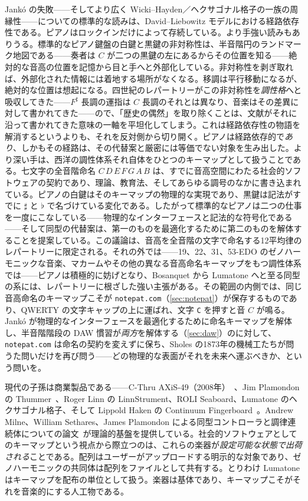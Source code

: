 \documentclass[10pt,letterpaper,twocolumn]{article}
\begin{document}
Jankó の失敗——そしてより広く Wicki--Hayden／ヘクサゴナル格子の一族の周縁性——についての標準的な読みは、David--Liebowitz モデルにおける経路依存性である。ピアノはロックインだけによって存続している。より手強い読みもありうる。標準的なピアノ鍵盤の白鍵と黒鍵の非対称性は、半音階円のランドマーク地図である——奏者は $C$ が二つの黒鍵の左にあるからその位置を知る——絶対的な音高の位置を記憶から目と手へと外部化している。非対称性を剥ぎ取れば、外部化された情報には着地する場所がなくなる。移調は平行移動になるが、絶対的な位置は想起になる。四世紀のレパートリーがこの非対称性を\emph{調性格}へと吸収してきた——$F^\sharp$ 長調の運指は $C$ 長調のそれとは異なり、音楽はその差異に対して書かれてきた——ので、「歴史の偶然」を取り除くことは、文献がそれに沿って書かれてきた意味の一軸を平坦化してしまう。これは経路依存性の物語を解消するというよりも、それを反対側から切り開く。ピアノは経路依存的で\emph{あり}、しかもその経路は、その代替案と厳密には等価でない対象を生み出した。より深い手は、西洋の調性体系それ自体をひとつのキーマップとして扱うことである。七文字の全音階命名 $C\,D\,E\,F\,G\,A\,B$ は、すでに音高空間にわたる社会的ソフトウェアの契約であり、理論、教育法、そしてあらゆる調号のなかに書き込まれている。ピアノの白鍵はそのキーマップの物理的な実現であり、黒鍵は記法がすでに $\sharp$ と $\flat$ で名づけている変化である。したがって標準的なピアノは二つの仕事を一度にこなしている——物理的なインターフェースと記法的な符号化である——そして同型の代替案は、第一のものを最適化するために第二のものを解体することを提案している。この議論は、音高を全音階の文字で命名する12平均律のレパートリーに限定される。それの外では——19、22、31、53-EDO のゼノハーモニックな音楽、マカームやその他の異なる音高命名キーマップをもつ調性体系では——ピアノは積極的に妨げとなり、Bosanquet から Lumatone へと至る同型の系には、レパートリーに根ざした強い主張がある。その範囲の内側では、同じ音高命名のキーマップこそが \texttt{notepat.com}（\textsection\ref{sec:notepat}）が保存するものであり、QWERTY の文字キャップの上に運ばれ、文字 \texttt{C} を押すと音 $C$ が鳴る。Jankó が物理的なインターフェースを最適化するために命名キーマップを解体し、半音階階段の DAW 慣習が\emph{両方}を解体する（\textsection\ref{sec:daw}）のに対して、\texttt{notepat.com} は命名の契約を変えずに保ち、Sholes の1873年の機械工たちが問うた問いだけを再び問う——どの物理的な表面がそれを未来へ運ぶべきか、という問いを。

現代の子孫は商業製品である——C-Thru AXiS-49（2008年）~\citep{cthru2008axis49}、Jim Plamondon の Thummer~\citep{plamondon2003thummer}、Roger Linn の LinnStrument、ROLI Seaboard、Lumatone のヘクサゴナル格子、そして Lippold Haken の Continuum Fingerboard~\citep{haken1998indiscrete}。Andrew Milne、William Sethares、James Plamondon による同型コントローラと調律連続体についての論文~\citep{milne2007isomorphic,milne2008tuning}が理論的基盤を提供している。社会的ソフトウェアとしてのキーマップという視点から際立つのは、これらの楽器が\emph{設定可能な状態で出荷される}ことである。配列はユーザーがアップロードする明示的な対象であり、ゼノハーモニックの共同体は配列をファイルとして共有する。とりわけ Lumatone はキーマップを配布の単位として扱う。楽器は基体であり、キーマップこそがそれを音楽的にする人工物である。
\end{document}
